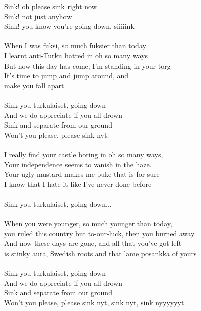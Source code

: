 
            Sink! oh please sink right now \\
            Sink! not just anyhow \\
            Sink! you know you're going down, siiiiink \\
\hspace{10mm} \\
            When I was fuksi, so much fuksier than today \\
            I learnt anti-Turku hatred in oh so many ways \\
            But now this day has come, I'm standing in your torg \\
            It's time to jump and jump around, and \\
            make you fall apart. \\
\hspace{10mm} \\
            Sink you turkulaiset, going down \\
            And we do appreciate if you all drown \\
            Sink and separate from our ground \\
            Won't you please, please sink nyt. \\
\hspace{10mm} \\
            I really find your castle boring in oh so many ways, \\
            Your independence seems to vanish in the haze. \\
            Your ugly mustard makes me puke that is for sure \\
            I know that I hate it like I've never done before \\
\hspace{10mm} \\
            Sink you turkulaiset, going down... \\
\hspace{10mm} \\
            When you were younger, so much younger than today, \\
            you ruled this country but to-our-luck, then you burned away \\
            And now these days are gone, and all that you've got left \\
            is stinky aura, Swedish roots and that lame posankka of yours \\
\hspace{10mm} \\
            Sink you turkulaiset, going down \\
            And we do appreciate if you all drown \\
            Sink and separate from our ground \\
            Won't you please, please sink nyt, sink nyt, sink nyyyyyyt. \\
